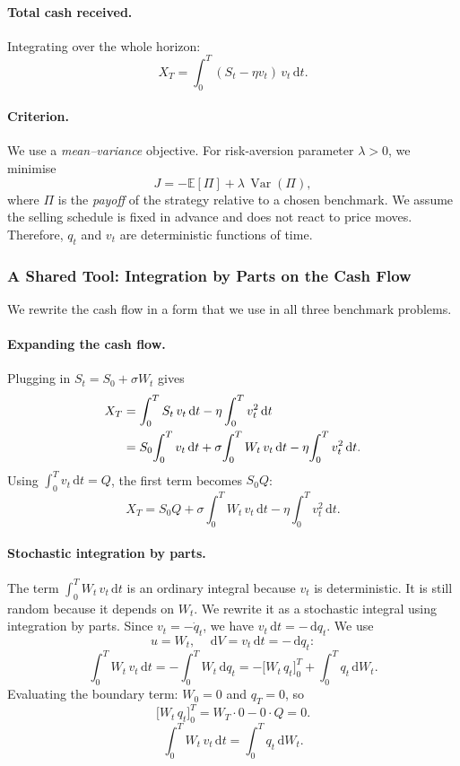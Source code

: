\documentclass[12pt, a4paper]{article}
\newcommand{\E}{\mathbb{E}}
\newcommand{\Var}{\operatorname{Var}}
\newcommand{\dd}{\,\mathrm{d}}
\begin{document}
\paragraph{Total cash received.}
Integrating over the whole horizon:
\[
  X_T = \int_0^T (S_t - \eta v_t)\,v_t \dd t.
\]

\paragraph{Criterion.}
We use a \emph{mean--variance} objective. For risk-aversion parameter $\lambda > 0$, we minimise
\[
  J = -\E[\Pi] + \lambda\,\Var(\Pi),
\]
where $\Pi$ is the \emph{payoff} of the strategy relative to a chosen benchmark.
We assume the selling schedule is fixed in advance and does not react to price moves.
Therefore, $q_t$ and $v_t$ are deterministic functions of time.

\subsubsection{A Shared Tool: Integration by Parts on the Cash Flow}
\label{sec:ibp}

We rewrite the cash flow in a form that we use in all three benchmark problems.

\paragraph{Expanding the cash flow.}
Plugging in $S_t = S_0 + \sigma W_t$ gives
\begin{align}
  X_T
  &= \int_0^T S_t\,v_t \dd t - \eta\int_0^T v_t^2 \dd t \notag\\
  &= S_0\!\int_0^T v_t \dd t
     + \sigma\!\int_0^T W_t\,v_t \dd t
     - \eta\!\int_0^T v_t^2 \dd t.
\end{align}
Using $\int_0^T v_t \dd t = Q$, the first term becomes $S_0 Q$:
\begin{equation}
  X_T = S_0 Q + \sigma\!\int_0^T W_t\,v_t \dd t - \eta\!\int_0^T v_t^2 \dd t.
  \label{eq:XT-raw}
\end{equation}

\paragraph{Stochastic integration by parts.}
The term $\int_0^T W_t \,v_t \dd t$ is an ordinary integral because $v_t$ is deterministic.
It is still random because it depends on $W_t$.
We rewrite it as a stochastic integral using integration by parts.
Since $v_t = -\dot q_t$, we have $v_t \dd t = -\dd q_t$.
We use
\[
  u = W_t, \quad \dd V = v_t \dd t = -\dd q_t:
\]
\[
  \int_0^T W_t\,v_t \dd t
  = -\int_0^T W_t \dd q_t
  = -\bigl[W_t\,q_t\bigr]_0^T + \int_0^T q_t \dd W_t.
\]
Evaluating the boundary term: $W_0 = 0$ and $q_T = 0$, so
\[
  \bigl[W_t\,q_t\bigr]_0^T = W_T\cdot 0 - 0\cdot Q = 0.
\]
\begin{equation}
  \boxed{\int_0^T W_t\,v_t \dd t = \int_0^T q_t \dd W_t.}
  \label{eq:ibp}
\end{equation}
\end{document}
